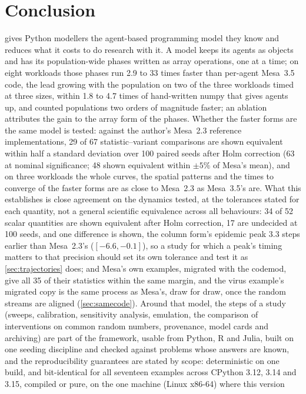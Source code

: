 \section{Conclusion}
\label{sec:conclusion}

\modelly{} gives Python modellers the agent-based programming model they know and reduces
what it costs to do research with it. A model keeps its agents as objects and has its
population-wide phases written as array operations, one at a time; on eight workloads those
phases run 2.9 to 33 times faster than per-agent Mesa~3.5 code, the lead growing with the
population on two of the three workloads timed at three sizes, within 1.8 to 4.7 times of hand-written numpy that gives agents up, and counted
populations two orders of magnitude faster; an ablation attributes the gain to the array
form of the phases. Whether the faster forms are the same model is tested: against the author's Mesa~2.3
reference implementations, 29 of 67 statistic--variant comparisons are shown equivalent within half
a standard deviation over 100 paired seeds after Holm correction (63 at nominal significance;
48 shown equivalent within $\pm 5\%$ of Mesa's mean), and on three workloads the whole
curves, the spatial patterns and the times to converge of the faster forms are as close to
Mesa~2.3 as Mesa~3.5's are. What this establishes is close agreement on the dynamics
tested, at the tolerances stated for each quantity, not a general scientific equivalence
across all behaviours: 34 of 52 scalar quantities are shown equivalent after Holm
correction, 17 are undecided at 100 seeds, and one difference is shown, the column
form's epidemic peak 3.3 steps earlier than Mesa~2.3's ($[-6.6, -0.1]$), so a study for
which a peak's timing matters to that precision should set its own tolerance and test it
as \cref{sec:trajectories} does; and Mesa's own examples, migrated with the codemod, give all 35 of
their statistics within the same margin, and the virus example's migrated copy is the same
process as Mesa's, draw for draw, once the random streams are aligned (\cref{sec:samecode}). Around that model, the
steps of a study (sweeps, calibration, sensitivity analysis, emulation, the comparison of
interventions on common random numbers, provenance, model cards and archiving) are part of the
framework, usable from Python, R and Julia, built on one seeding discipline and checked against
problems whose answers are known, and the reproducibility guarantees are stated by scope:
deterministic on one build, and bit-identical for all seventeen examples across CPython
3.12, 3.14 and 3.15, compiled or pure, on the one machine (Linux x86-64) where this version
